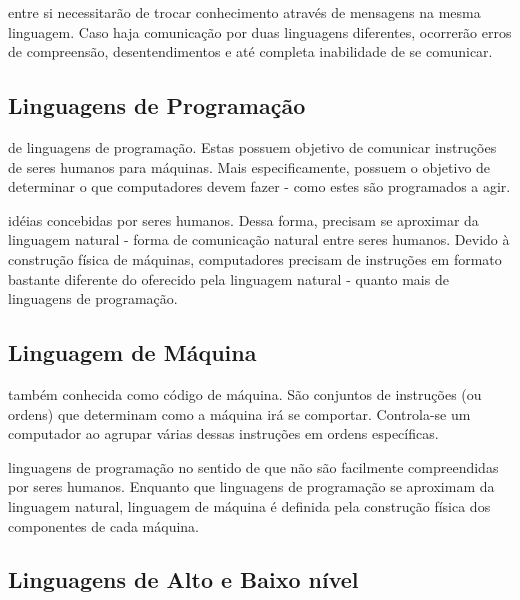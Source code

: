 entre si necessitarão de trocar conhecimento através de mensagens na mesma
linguagem. Caso haja comunicação por duas linguagens diferentes, ocorrerão erros
de compreensão, desentendimentos e até completa inabilidade de se comunicar.

\subsection{Linguagens de Programação}

de linguagens de programação. Estas possuem objetivo de comunicar instruções de
seres humanos para máquinas. Mais especificamente, possuem o objetivo de
determinar o que computadores devem fazer - como estes são programados a agir.

idéias concebidas por seres humanos. Dessa forma, precisam se aproximar da
linguagem natural - forma de comunicação natural entre seres humanos.  Devido à
construção física de máquinas, computadores precisam de instruções em formato
bastante diferente do oferecido pela linguagem natural - quanto mais de
linguagens de programação.

\subsection{Linguagem de Máquina}

também conhecida como código de máquina. São conjuntos de instruções (ou ordens)
que determinam como a máquina irá se comportar. Controla-se um computador ao
agrupar várias dessas instruções em ordens específicas.

linguagens de programação no sentido de que não são facilmente compreendidas por
seres humanos. Enquanto que linguagens de programação se aproximam da linguagem
natural, linguagem de máquina é definida pela construção física dos componentes
de cada máquina.

\subsection{Linguagens de Alto e Baixo nível}


